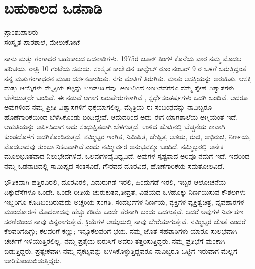 {\fontsize{14}{16}\selectfont
\chapter{ಬಹುಕಾಲದ ಒಡನಾಡಿ}

\begin{center}
\smallskip
ಪ್ರಾಂಶುಪಾಲರು\\
ಸಂಸ್ಕೃತ ಪಾಠಶಾಲೆ, ಮೇಲುಕೋಟೆ
\addrule
\end{center}

ನಾನು ಮತ್ತು ಗಂಗಾಧರ ಬಹುಕಾಲದ ಒಡನಾಡಿಗಳು. 1975ರ ಜೂನ್ ತಿಂಗಳ ಕೊನೆಯ ವಾರ ನಮ್ಮ ಮೊದಲ ಪರಿಚಯ. ರಾತ್ರಿ 10 ಗಂಟೆಯ ಸಮಯ. ಸಂಸ್ಕೃತ ಕಾಲೇಜಿನ ಹಾಸ್ಟೇಲ್ ರೂಂ ನಂಬರ್ 9 ರ ಒಳಗೆ ಬರುತ್ತಿದ್ದಂತೆ ನನ್ನ ಮತ್ತು\break ಗಂಗಾಧರನ ಮುಖ ದರ್ಶನವಾಯಿತು. ನಗು ಮಾತಿಗೆ ತಿರುಗಿತು. ಮಾತು ಆಸಕ್ತಿಯನ್ನು ಅರು\-ಹಿತು. ಆಸಕ್ತಿ ಮತ್ತು ಆಯ್ಕೆಗಳು ಮೈತ್ರಿಯ ಕಟ್ಟನ್ನು ಬಲಪಡಿಸಿದವು. ಅಂದಿನಿಂದ ಇಂದಿನ\-ವರೆಗೂ ನಮ್ಮ ಸ್ನೇಹ ವಿಶ್ವಾಸಗಳು ಬೆಳೆಯುತ್ತಲೇ ಬಂದಿವೆ. ಈ ನಡುವೆ ಆಗಾಗ ಏರುಪೇರುಗಳಾಗಿವೆ , ಸ್ಪರ್ಧೆಸಂಘರ್ಷಗಳು ಒದಗಿ ಬಂದಿವೆ. ಆದರೂ ಅವುಗಳಿಂದ ನಮ್ಮ ಪ್ರೀತಿ ವಿಶ್ವಾಸಗಳಿಗೆ ಧಕ್ಕೆಯಾಗಲಿಲ್ಲ. ಮೈತ್ರಿಯ ಈ ಸಂಬಂಧವನ್ನು ನಾವಿಬ್ಬರೂ ಹೊಣೆಗಾರಿಕೆಯಿಂದ ಬೆಳೆಸಿಕೊಂಡು ಬಂದಿದ್ದೇವೆ. ಆದುದರಿಂದ ಅದು ಈಗ ಯಾಗಶಾಲೆಯ ಅಗ್ನಿಯಂತೆ ಇದೆ. ಆಹುತಿಯನ್ನು ಅರ್ಪಿಸಿದಾಗ ಅದು ಸಂಧುಕ್ಷಿತವಾಗಿ ಬೆಳಗುತ್ತದೆ. ಉಳಿದ ಹೊತ್ತಿನಲ್ಲಿ ಬೆಚ್ಚನೆಯ ಕಾವಾಗಿ ಕುಂಡದೊಳಗೆ ಅಡಗಿ\-ಕೊಂಡಿರುತ್ತದೆ. ನಮ್ಮಿಬ್ಬರ ಇಂಗಿತ, ನಿಮಿಷಿತ, ಚೇಷ್ಟಿತ, ಆಶಯ, ರುಚಿ, ಅಭಿರುಚಿ, ನಿರ್ಣಯ, ಮೊದಲಾದವು ತುಂಬಾ ನಿಕಟವಾಗಿವೆ ಎಂದು ನಮ್ಮೀರ್ವರ   \hbox{ಅನುಭವಕ್ಕೂ} ಬಂದಿದೆ. ನಮ್ಮಿಬ್ಬರಲ್ಲಿ ಅನೇಕ ಮೂಲಭೂತವಾದ ನಿಲು\enginline{-}ಭೇದಗಳಿವೆ. ಒಲವುಗಳ\break ವೈವಿಧ್ಯವಿದೆ. ಅವುಗಳ ಸ್ಪಷ್ಟವಾದ ಅರಿವೂ ನಮಗೆ ಇದೆ. ಇದರಿಂದ ನಮ್ಮ ಒಡನಾಟದಲ್ಲಿ  ಸಾಮಿಪ್ಯದ ಸಂತಸವಿದೆ, ಗೌರವದ ದೂರವಿದೆ, ಹೊಣೆಗಾರಿಕೆಯ ಸಮತೋಲ\-ವಿದೆ. 

ಭೌತಿಕವಾಗಿ ಹತ್ತಿರವಿರಲಿ, ದೂರವಿರಲಿ, ಎದುರುಗಡೆ ಇರಲಿ, ಹಿಂದುಗಡೆ ಇರಲಿ, ಇಬ್ಬರ ಆಲೋಚನೆಯ ದಿಕ್ಕು\enginline{-}ದೆಸೆಗಳೂ ಒಂದೇ. ಒಂದೇ ರೀತಿಯ ಚುರುಕುತನ,\break ತೀವ್ರತೆ, ವಿಷಯದ ಒಳಹೊಕ್ಕು ನಿರ್ಣಯಿಸುವ ಕೌಶಲಗಳು ಇಬ್ಬರಿಗೂ ಕೂಡಿ\-ಬಂದಿರುವುದು  ಅಚ್ಚರಿಯ ಸಂಗತಿ. ಸಂದರ್ಭಗಳ ನಿರ್ಣಯ, ವ್ಯಕ್ತಿಗಳ ವ್ಯಕ್ತಿತ್ವಚಿತ್ರ, ವ್ಯವಹಾರಗಳ ಮುಂದೋರಣೆ ಮೊದಲಾದವು  ಹೆಚ್ಚು ಕಡಿಮೆ  ಒಂದೇ ತೆರನಾಗಿ ಬಂದು ಒದಗುತ್ತವೆ.  ಆದರೆ ಅವುಗಳ ನಿರ್ವಹಣ ಸರಣಿಯಿಂದ  ನಾವು ಭಿನ್ನರಾಗುತ್ತೇವೆ. ಕ್ರಿಯೆ\-ಗಳ ಆಯ್ಕೆಯಲ್ಲಿ ನಾವು ಬೇರೆಯಾಗುತ್ತೇವೆ. ನಮ್ಮಿಬ್ಬರ ಜೊತೆ ಎಂದರೆ ಕೆಲವರಿಗೆ\break ಹಿಗ್ಗು; ಕೆಲವರಿಗೆ ಕಣ್ಣು; ಇನ್ನೂಕೆಲವರಿಗೆ  ಭಯ. ನಮ್ಮ ಜೊತೆ ಸಹಪಾಠಿಗಳು ಯಾರೂ ಸುಲಭವಾಗಿ ಚರ್ಚೆಗೆ ಇಳಿಯುತ್ತಿರಲಿಲ್ಲ.  ನಮ್ಮ ಪ್ರಶ್ನೆಯ ಬಿರುಸಿಗೆ ಅವರು ತತ್ತರಿ\-ಸುತ್ತಿದ್ದರು. ನಮ್ಮ ಪ್ರತಿಭೆಗೆ ಮಂಕಾಗಿ ಬಿಡುತ್ತಿದ್ದರು. ಪ್ರತ್ಯೇಕವಾಗಿ ನಮ್ಮ ನೈಕಟ್ಯ\-ವನ್ನು ಬಳಸಿಕೊಳ್ಳುತ್ತಿದ್ದವರೂ ನಾವಿಬ್ಬರೂ ಒಟ್ಟಿಗೆ ಇರುವಾಗ ಮೆಲ್ಲಗೆ ಜಾರಿಕೊಂಡು\break ಬಿಡುತ್ತಿದ್ದರು. 

}
